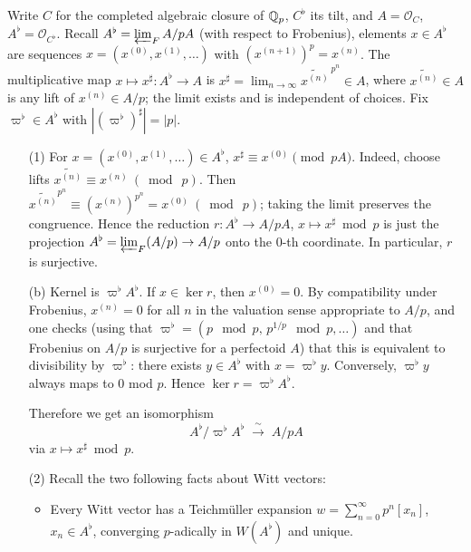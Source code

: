 \documentclass[12pt]{article}  %
\begin{document}
\begin{solution}
Write $C$ for the completed algebraic closure of $\mathbb{Q}_p$, $C^\flat$ its tilt, and
    $A=\mathcal O_C$, $A^\flat=\mathcal O_{C^\flat}$.
    Recall $A^\flat=\varprojlim_{F} A/pA$ (with respect to Frobenius), elements $x\in A^\flat$ are sequences
    $x=(x^{(0)},x^{(1)},\ldots)$ with $(x^{(n+1)})^p=x^{(n)}$.
    The multiplicative map $x\mapsto x^\sharp\colon A^\flat\to A$ is
    $x^\sharp=\lim_{n\to\infty} \widetilde{x^{(n)}}^{\,p^n}\in A$, where $\widetilde{x^{(n)}}\in A$ is any lift of $x^{(n)}\in A/p$; the limit exists and is independent of choices. Fix $\varpi^\flat\in A^\flat$ with $|(\varpi^\flat)^\sharp|=|p|$.

\begin{enumerate}
    \item[(1)] For $x=(x^{(0)},x^{(1)},\ldots)\in A^\flat$,
    $x^\sharp \equiv x^{(0)} \pmod{pA}$.
    Indeed, choose lifts $\widetilde{x^{(n)}}\equiv x^{(n)}\ (\bmod\ p)$. Then
    $\widetilde{x^{(n)}}^{p^n}\equiv (x^{(n)})^{p^n}=x^{(0)}\ (\bmod\ p)$;
    taking the limit preserves the congruence. Hence the reduction
    $r: A^\flat\longrightarrow A/pA$, $x\longmapsto x^\sharp\bmod p$
    is just the projection $A^\flat=\varprojlim_F (A/p)\to A/p$ onto the 0-th coordinate.
    In particular, $r$ is surjective.

    (b) Kernel is $\varpi^\flat A^\flat$.
    If $x\in\ker r$, then $x^{(0)}=0$. By compatibility under Frobenius,
    $x^{(n)}=0$ for all $n$ in the valuation sense appropriate to $A/p$, and one checks
    (using that $\varpi^\flat=(p\!\!\mod p,\,p^{1/p}\!\!\mod p,\ldots)$ and that Frobenius on $A/p$
    is surjective for a perfectoid $A$) that this is equivalent to divisibility by
    $\varpi^\flat$: there exists $y\in A^\flat$ with $x=\varpi^\flat y$.
    Conversely, $\varpi^\flat y$ always maps to 0 mod $p$.
    Hence $\ker r=\varpi^\flat A^\flat$.

Therefore we get an isomorphism
\[A^\flat/\varpi^\flat A^\flat \;\xrightarrow{\ \sim\ }\; A/pA\]
via $x\mapsto x^\sharp\bmod p$.

    \item[(2)] Recall the two following facts about Witt vectors:
    \begin{itemize}
        \item Every Witt vector has a Teichmüller expansion
    $w=\sum_{n=0}^\infty p^n [x_n]$, $x_n\in A^\flat$,
    converging $p$-adically in $W(A^\flat)$ and unique.


\end{itemize}
\end{enumerate}
\end{solution}
\end{document}
